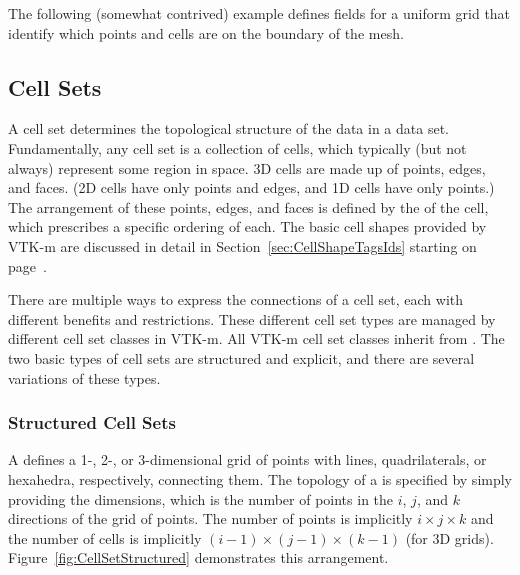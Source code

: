 The following (somewhat contrived) example defines fields for a uniform
grid that identify which points and cells are on the boundary of the mesh.



\subsection{Cell Sets}
\label{sec:DataSets:CellSets}


A cell set determines the topological structure of the data in a data set.
Fundamentally, any cell set is a collection of cells, which typically (but
not always) represent some region in space. 3D cells are made up of points,
edges, and faces. (2D cells have only points and edges, and 1D cells have
only points.) The arrangement of these points, edges, and faces is defined
by the 
of the cell, which prescribes a specific ordering of each. The basic cell
shapes provided by VTK-m are discussed in detail in
Section~\ref{sec:CellShapeTagsIds} starting on
page~\pageref{sec:CellShapeTagsIds}.

There are multiple ways to express the connections of a cell set, each with
different benefits and restrictions. These different cell set types are
managed by different cell set classes in VTK-m. All VTK-m cell set classes
inherit from . The two basic types of cell sets are
structured and explicit, and there are several variations of these types.

\subsubsection{Structured Cell Sets}


A  defines a 1-, 2-, or 3-dimensional grid of
points with lines, quadrilaterals, or hexahedra, respectively, connecting
them. The topology of a  is specified by
simply providing the dimensions, which is the number of points in the $i$,
$j$, and $k$ directions of the grid of points. The number of points is
implicitly $i \times j \times k$ and the number of cells is implicitly
$(i-1) \times (j-1) \times (k-1)$ (for 3D grids).
Figure~\ref{fig:CellSetStructured} demonstrates this arrangement.

